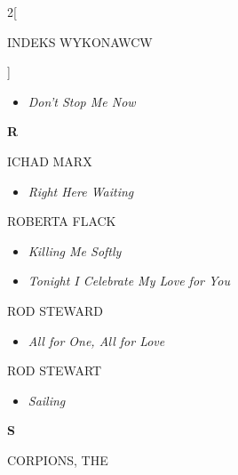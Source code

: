 \documentclass[a4paper]{report}
\begin{document}
\begin{multicols*}{2}[\begin{Huge}INDEKS WYKONAWCW\end{Huge}\vspace{1cm}]
\begin{minipage}{\columnwidth}
\begin{itemize}[topsep=3pt, after=\vspace{3mm}]
		\itemsep0em
		\item[]\textit{Don't Stop Me Now}  \\
	\end{itemize}
\end{minipage}
\begin{minipage}{\columnwidth}
	\begin{Large}\textbf{R}\end{Large}ICHAD MARX 
	\begin{itemize}[topsep=3pt, after=\vspace{3mm}]
		\itemsep0em
		\item[]\textit{Right Here Waiting}  \\
	\end{itemize}
\end{minipage}
\begin{minipage}{\columnwidth}
	ROBERTA FLACK 
	\begin{itemize}[topsep=3pt, after=\vspace{3mm}]
		\itemsep0em
		\item[]\textit{Killing Me Softly}  \\
		\item[]  \textit{Tonight I Celebrate My Love for You}  \\
	\end{itemize}
\end{minipage}
\begin{minipage}{\columnwidth}
	ROD STEWARD 
	\begin{itemize}[topsep=3pt, after=\vspace{3mm}]
		\itemsep0em
		\item[]\textit{All for One, All for Love}  \\
	\end{itemize}
\end{minipage}
\begin{minipage}{\columnwidth}
	ROD STEWART 
	\begin{itemize}[topsep=3pt, after=\vspace{3mm}]
		\itemsep0em
		\item[]\textit{Sailing}  \\
	\end{itemize}
\end{minipage}
\begin{minipage}{\columnwidth}
	\begin{Large}\textbf{S}\end{Large}CORPIONS, THE 
	\begin{itemize}[topsep=3pt, after=\vspace{3mm}]

\end{itemize}
\end{minipage}
\end{multicols*}
\end{document}
